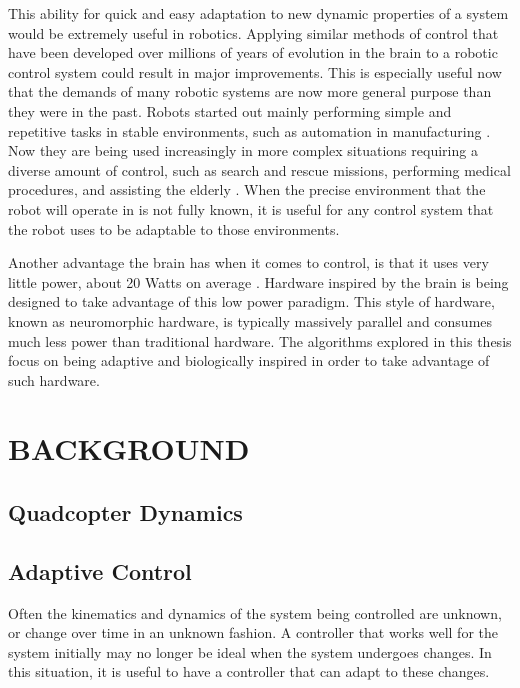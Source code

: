 \documentclass[letterpaper, 10 pt, conference]{ieeeconf}  %
\begin{document}
This ability for quick and easy adaptation to new dynamic properties of a system would be extremely useful in robotics. 
Applying similar methods of control that have been developed over millions of years of evolution in the brain to a robotic control system could result in major improvements. 
This is especially useful now that the demands of many robotic systems are now more general purpose than they were in the past. 
Robots started out mainly performing simple and repetitive tasks in stable environments, such as automation in manufacturing \cite{garcia2007evolution}. 
Now they are being used increasingly in more complex situations requiring a diverse amount of control, such as search and rescue missions, performing medical procedures, and assisting the elderly \cite{garcia2007evolution, hockstein2007history, nourbakhsh2005human, lacey1998application}. 
When the precise environment that the robot will operate in is not fully known, it is useful for any control system that the robot uses to be adaptable to those environments.

Another advantage the brain has when it comes to control, is that it uses very little power, about 20 Watts on average \cite{hart1975brain}.
Hardware inspired by the brain is being designed to take advantage of this low power paradigm. 
This style of hardware, known as neuromorphic hardware, is typically massively parallel and consumes much less power than traditional hardware.
The algorithms explored in this thesis focus on being adaptive and biologically inspired in order to take advantage of such hardware.

\section{BACKGROUND}

\subsection{Quadcopter Dynamics}



\subsection{Adaptive Control}

Often the kinematics and dynamics of the system being controlled are unknown, or change over time in an unknown fashion. 
A controller that works well for the system initially may no longer be ideal when the system undergoes changes. 
In this situation, it is useful to have a controller that can adapt to these changes.
\end{document}
